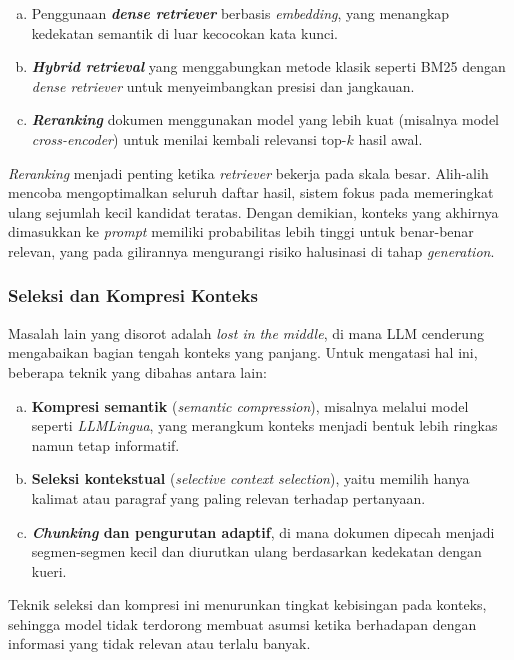 \begin{enumerate}[a.]
  \item Penggunaan \textbf{\textit{dense retriever}} berbasis \textit{embedding}, yang menangkap kedekatan semantik di luar kecocokan kata kunci.
  \item \textbf{\textit{Hybrid retrieval}} yang menggabungkan metode klasik seperti BM25 dengan \textit{dense retriever} untuk menyeimbangkan presisi dan jangkauan.
  \item \textbf{\textit{Reranking}} dokumen menggunakan model yang lebih kuat (misalnya model \textit{cross-encoder}) untuk menilai kembali relevansi top-$k$ hasil awal.
\end{enumerate}

\textit{Reranking} menjadi penting ketika \textit{retriever} bekerja pada skala besar. Alih-alih mencoba mengoptimalkan seluruh daftar hasil, sistem fokus pada memeringkat ulang sejumlah kecil kandidat teratas. Dengan demikian, konteks yang akhirnya dimasukkan ke \textit{prompt} memiliki probabilitas lebih tinggi untuk benar-benar relevan, yang pada gilirannya mengurangi risiko halusinasi di tahap \textit{generation}.

\subsubsection{Seleksi dan Kompresi Konteks}

Masalah lain yang disorot adalah \textit{lost in the middle}, di mana LLM cenderung mengabaikan bagian tengah konteks yang panjang. Untuk mengatasi hal ini, beberapa teknik yang dibahas antara lain:

\begin{enumerate}[a.]
  \item \textbf{Kompresi semantik} (\textit{semantic compression}), misalnya melalui model seperti \textit{LLMLingua}, yang merangkum konteks menjadi bentuk lebih ringkas namun tetap informatif.
  \item \textbf{Seleksi kontekstual} (\textit{selective context selection}), yaitu memilih hanya kalimat atau paragraf yang paling relevan terhadap pertanyaan.
  \item \textbf{\textit{Chunking} dan pengurutan adaptif}, di mana dokumen dipecah menjadi segmen-segmen kecil dan diurutkan ulang berdasarkan kedekatan dengan kueri.
\end{enumerate}

Teknik seleksi dan kompresi ini menurunkan tingkat kebisingan pada konteks, sehingga model tidak terdorong membuat asumsi ketika berhadapan dengan informasi yang tidak relevan atau terlalu banyak.

